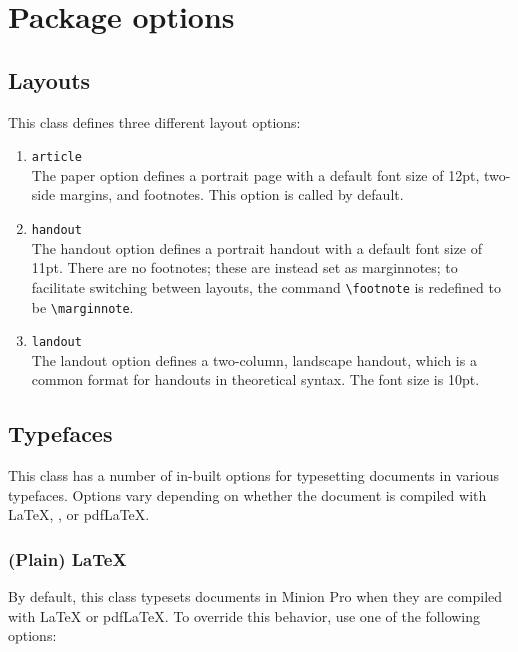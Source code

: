 \documentclass[11pt, tipa, color]{./lingdoc}
\newcommand{\Option}[1]{\texttt{#1}}
\begin{document}
  \section{Package options}

    
  \subsection{Layouts}

    This class defines three different layout options:
    
      \begin{enumerate}[leftmargin=0em]
        \item \Option{article} \\ The paper option defines a portrait page with a default font size of 12pt, two-side margins, and footnotes. This option is called by default.
        
        \item \Option{handout} \\ The handout option defines a portrait handout with a default font size of 11pt. There are no footnotes; these are instead set as marginnotes; to facilitate switching between layouts, the command \verb+\footnote+ is redefined to be \verb+\marginnote+.
        
        \item \Option{landout} \\ The landout option defines a two-column, landscape handout, which is a common format for handouts in theoretical syntax. The font size is 10pt.
      \end{enumerate}

  \subsection{Typefaces}
  
    This class has a number of in-built options for typesetting documents in various typefaces. Options vary depending on whether the document is compiled with \LaTeX{}, \XeLaTeX, or pdf\LaTeX{}.
    
  \subsubsection[Plain LaTeX]{(Plain) \LaTeX{}}
  
    By default, this class typesets documents in Minion Pro when they are compiled with \LaTeX{} or pdf\LaTeX{}. To override this behavior, use one of the following options:
  
\end{document}
